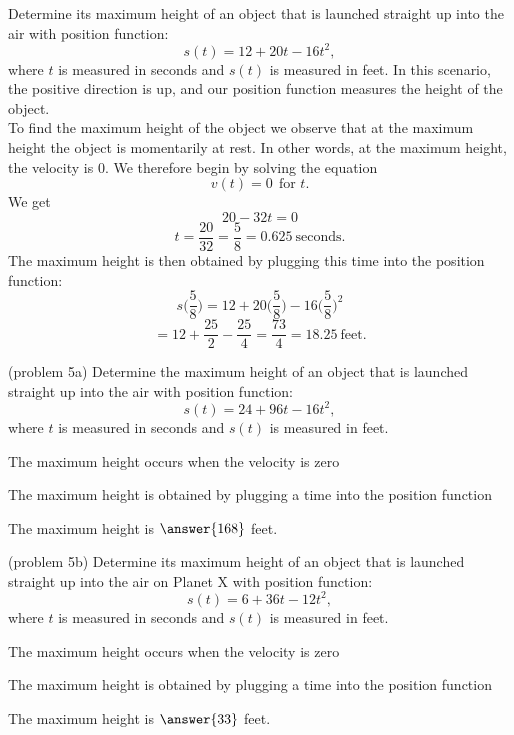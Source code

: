 \documentclass[handout]{ximera}
\begin{document}
\begin{example}[example 5]
Determine its maximum height
of an object that is launched straight up into the air with position function:
\[s(t) = 12 + 20t - 16t^2,\]
where $t$ is measured in seconds and $s(t)$ is measured in feet. 
In this scenario, the positive direction is up, and our position function measures the height of the object.\\
To find the maximum height of the object we observe that at the maximum height the object is momentarily at rest. 
In other words, at the maximum height, the velocity is 0. We therefore begin by solving the equation
\[v(t) = 0  \  \ \text{for $t$.}\]
 We get 
\[20-32t = 0\]
\[t = \frac{20}{32} = \frac{5}{8} = 0.625 \ \text{seconds}.\]
The maximum height is then obtained by plugging this time into the position function:
\[s\Big(\frac{5}{8}\Big) = 12 + 20\Big(\frac{5}{8}\Big) - 16\Big(\frac{5}{8}\Big)^2 \]
\[= 12 + \frac{25}{2} - \frac{25}{4} = \frac{73}{4} = 18.25\  \text{feet}. \]
\end{example}


\begin{problem}(problem 5a)
Determine the maximum height
of an object that is launched straight up into the air with position function:
\[s(t) = 24 + 96t - 16t^2,\]
where $t$ is measured in seconds and $s(t)$ is measured in feet. 

\begin{hint}
The maximum height occurs when the velocity is zero
\end{hint}
\begin{hint}
The maximum height is obtained by plugging a time into the position function
\end{hint}

The maximum height is $\answer{168}$ feet.

\end{problem}


\begin{problem}(problem 5b)
Determine its maximum height
of an object that is launched straight up into the air on Planet X with position function:
\[s(t) = 6 + 36t - 12t^2,\]
where $t$ is measured in seconds and $s(t)$ is measured in feet. 

\begin{hint}
The maximum height occurs when the velocity is zero
\end{hint}
\begin{hint}
The maximum height is obtained by plugging a time into the position function
\end{hint}

The maximum height is $\answer{33}$ feet.

\end{problem}
 
\end{document}
